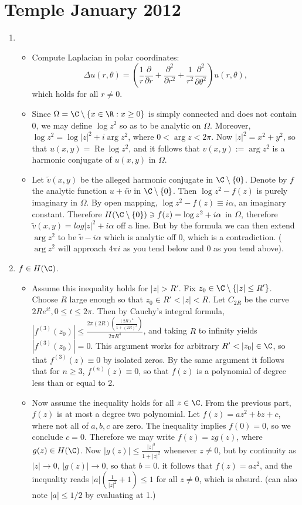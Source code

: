 \documentclass[11pt]{book}
\theoremstyle{definition}
\renewcommand{\Re}{\operatorname{Re}}
\begin{document}
\section{Temple January 2012}
\begin{enumerate}
\item 
\begin{itemize}
\item
Compute Laplacian in polar coordinates:
\[
\Delta u(r,\theta) = \left(\frac{1}{r}\frac{\partial}{\partial r} + \frac{\partial^2}{\partial r^2} + \frac{1}{r^2}\frac{\partial^2}{\partial \theta^2}\right)u(r,\theta),
\]
which holds for all $r\neq 0$.
\item Since $\Omega = \C\setminus \{x\in \R : x\geq0\}$ is simply connected and does not contain 0, we may define $\log z^2$ so as to be analytic on $\Omega$. Moreover, $\log z^2 = \log |z|^2 + i \arg z^2$, where $0 < \arg z < 2\pi$. Now $|z|^2 = x^2+y^2$, so that $u(x,y)=\Re \log z^2$, and it follows that $v(x,y):=\arg z^2$ is a harmonic conjugate of $u(x,y)$ in $\Omega$.
\item Let $\tilde v(x,y)$ be the alleged harmonic conjugate in $\C\setminus\{0\}$. Denote by $f$ the analytic function $u+i\tilde v$ in $\C\setminus\{0\}$. Then $\log z^2 - f(z)$ is purely imaginary in $\Omega$. By open mapping, $\log z^2 - f(z)\equiv i\alpha$, an imaginary constant. Therefore $H(\C\setminus\{0\})\ni f(z)=\log z^2 + i\alpha$ in $\Omega$, therefore $\tilde v(x,y) = log|z|^2+i\alpha$ off a line. But by the formula we can then extend $\arg z^2$ to be $\tilde v - i\alpha$ which is analytic off $0$, which is a contradiction. ($\arg z^2$ will approach $4\pi i$ as you tend below and 0 as you tend above).   
\end{itemize}
\item $f\in H(\C)$.
\begin{itemize}
\item Assume this inequality holds for $|z|>R'$. Fix $z_0\in \C\setminus \{|z|\leq R'\}$. Choose $R$ large enough so that $z_0\in R'<|z|<R$. Let $C_{2R}$ be the curve $2Re^{it}, 0\leq t\leq 2\pi$. Then by Cauchy's integral formula, $|f^{(3)}(z_0)|\leq \frac{2\pi (2R)\left(\frac{(2R)^4}{1+(2R)^2}\right)}{2\pi R^4}$, and taking $R$ to infinity yields $|f^{(3)}(z_0)|=0$. This argument works for arbitrary $R'<|z_0|\in \C$, so that $f^{(3)}(z)\equiv 0$ by isolated zeros. By the same argument it follows that for $n\geq3$, $f^{(n)}(z)\equiv 0$, so that $f(z)$ is a polynomial of degree less than or equal to 2.
\item Now assume the inequality holds for all $z\in \C$. From the previous part, $f(z)$ is at most a degree two polynomial. Let $f(z)=az^2+bz+c$, where not all of $a,b,c$ are zero. The inequality implies $f(0)=0$, so we conclude $c=0$. Therefore we may write $f(z)=zg(z)$, where $g(z)\in H(\C)$. Now $|g(z)|\leq \frac{|z|^3}{1+|z|^2}$ whenever $z\neq 0$, but by continuity as $|z|\to 0$, $|g(z)|\to 0$, so that $b=0$. it follows that $f(z)=az^2$, and the inequality reads $|a|(\frac{1}{|z|^2}+1)\leq 1$ for all $z\neq 0$, which is absurd. (can also note $|a|\leq 1/2$ by evaluating at 1.) 

\end{itemize}
\end{enumerate}
\end{document}
